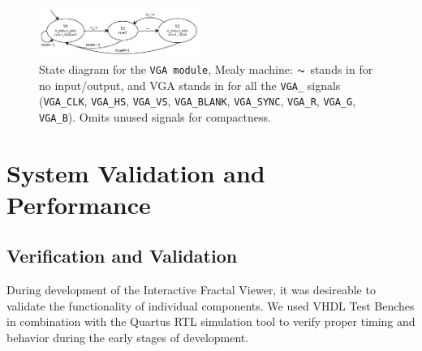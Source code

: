 \documentclass{article}
\begin{document}
\begin{figure}
  \centering
    \includegraphics[width=200px]{state_diagrams/vga.pdf}
  \caption{State diagram for the \texttt{VGA module}, Mealy machine: $\thicksim$
    stands in for no input/output, and VGA stands in for all the \texttt{VGA\_}
    signals (\texttt{VGA\_CLK}, \texttt{VGA\_HS}, \texttt{VGA\_VS},
    \texttt{VGA\_BLANK}, \texttt{VGA\_SYNC}, \texttt{VGA\_R}, \texttt{VGA\_G},
    \texttt{VGA\_B}). Omits unused signals for compactness.}
\end{figure}





\section{System Validation and Performance}

\subsection{Verification and Validation}

During development of the Interactive Fractal Viewer, it was desireable to validate the functionality of
individual components. We used VHDL Test Benches in combination with the Quartus RTL simulation tool to verify proper timing and behavior during the early stages of development.
\end{document}
